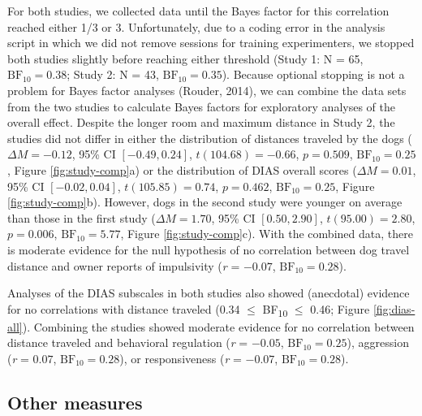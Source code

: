 \documentclass[
  pub,floatsintext]{apa6}
\begin{document}
For both studies, we collected data until the Bayes factor for this correlation reached either 1/3 or 3. Unfortunately, due to a coding error in the analysis script in which we did not remove sessions for training experimenters, we stopped both studies slightly before reaching either threshold (Study 1: N = 65, \(\mathrm{BF}_{\textrm{10}} = 0.38\); Study 2: N = 43, \(\mathrm{BF}_{\textrm{10}} = 0.35\)). Because optional stopping is not a problem for Bayes factor analyses (Rouder, 2014), we can combine the data sets from the two studies to calculate Bayes factors for exploratory analyses of the overall effect. Despite the longer room and maximum distance in Study 2, the studies did not differ in either the distribution of distances traveled by the dogs (\(\Delta M = -0.12\), 95\% CI \([-0.49, 0.24]\), \(t(104.68) = -0.66\), \(p = 0.509\), \(\mathrm{BF}_{\textrm{10}} = 0.25\), Figure \ref{fig:study-comp}a) or the distribution of DIAS overall scores (\(\Delta M = 0.01\), 95\% CI \([-0.02, 0.04]\), \(t(105.85) = 0.74\), \(p = 0.462\), \(\mathrm{BF}_{\textrm{10}} = 0.25\), Figure \ref{fig:study-comp}b). However, dogs in the second study were younger on average than those in the first study (\(\Delta M = 1.70\), 95\% CI \([0.50, 2.90]\), \(t(95.00) = 2.80\), \(p = 0.006\), \(\mathrm{BF}_{\textrm{10}} = 5.77\), Figure \ref{fig:study-comp}c). With the combined data, there is moderate evidence for the null hypothesis of no correlation between dog travel distance and owner reports of impulsivity (\emph{r} = \(-0.07\), \(\mathrm{BF}_{\textrm{10}} = 0.28\)).

Analyses of the DIAS subscales in both studies also showed (anecdotal) evidence for no correlations with distance traveled (0.34 \(\leq\) BF\textsubscript{10} \(\leq\) 0.46; Figure \ref{fig:dias-all}). Combining the studies showed moderate evidence for no correlation between distance traveled and behavioral regulation (\emph{r} = \(-0.05\), \(\mathrm{BF}_{\textrm{10}} = 0.25\)), aggression (\emph{r} = \(0.07\), \(\mathrm{BF}_{\textrm{10}} = 0.28\)), or responsiveness (\emph{r} = \(-0.07\), \(\mathrm{BF}_{\textrm{10}} = 0.28\)).

\hypertarget{other-measures}{%
\subsection{Other measures}\label{other-measures}}
\end{document}
